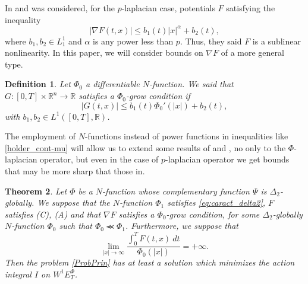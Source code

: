 \documentclass[twoside]{article}
\newtheorem{thm}{Theorem}[section]
\newtheorem{defi}[thm]{Definition}
\theoremstyle{remark}
\newcommand{\ephi}{E^{\Phi}}
\newcommand{\wphie}{W^{1}\ephi}
\newcommand{\rr}{\mathbb{R}}
\renewcommand{\leq}{\leqslant}
\begin{document}
In \cite{tang1998periodic} and \cite{tang2010periodic} was considered, for the $p$-laplacian case, potentials $F$ satisfying the inequality
\[ |\nabla F(t,x)|\leq b_1(t)|x|^{\alpha}+b_2(t),\]
where  $b_1,b_2 \in L^1_1$ and $\alpha$ is any power less than $p$. Thus, they said $F$ is a sublinear nonlinearity. In this paper, we will consider bounds on $\nabla F$ of a more general type.

\begin{defi} Let $\Phi_0$ a differentiable $N$-function. We said that $G:[0,T]\times\rr^n\to\rr$  satisfies a $\Phi_0$-\emph{grow condition} if
\begin{equation}\label{holder_cont-mu}
  \left| G(t,x) \right|\leq b_1(t)\Phi_0'(|x|)+b_2(t),
\end{equation}
with $b_1,b_2 \in L^1([0,T],\rr)$.

\end{defi}
The employment of  $N$-functions instead of power functions in  inequalities like  \eqref{holder_cont-mu}  will allow us to extend some results of   \cite{tang1998periodic} and \cite{tang2010periodic}, no only to the $\Phi$-laplacian operator, but even in the case of  $p$-laplacian operator we get bounds that may be more sharp that those in\cite{tang1998periodic,tang2010periodic}.


\begin{thm}\label{coercitividad-r} Let $\Phi$ be a $N$-function whose complementary function $\Psi$ is $\Delta_2$-globally. We suppose that the $N$-function $\Phi_1$ satisfies \eqref{eq:caract_delta2}, $F$ satisfies (C), (A) and that $\nabla F$ satisfies a $\Phi_0$-grow condition, for some $\Delta_2$-globally $N$-function  $\Phi_0$ such that $\Phi_0\llcurly\Phi_1$.  Furthermore, we suppose that
\begin{equation}\label{eq:propiedad-coercividad-phi0}
\lim_{|x|\to\infty}\frac{\int_{0}^{T}F(t,x)\ dt}{\Phi_0(|x|)}=+\infty.
\end{equation}
Then  the problem \eqref{ProbPrin} has at least a solution which minimizes the action integral $I$ on $\wphie_T$.
\end{thm}
\end{document}
